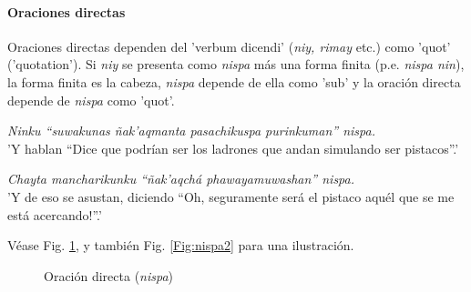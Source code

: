\documentclass[a4paper,11pt,DIV12]{scrartcl}
\begin{document}
\paragraph{Oraciones directas}
Oraciones directas dependen del 'verbum dicendi' ({\em niy, rimay} etc.) como 'quot' ('quotation'). Si {\em niy} se presenta como {\em nispa} m\'as una forma finita (p.e. {\em nispa nin}), la forma finita es la cabeza, {\em nispa} depende de ella como 'sub' y la oraci\'on directa depende de {\em nispa} como 'quot'.

\begin{examples}
 \item {\em Ninku ``suwakunas \~nak'aqmanta pasachikuspa purinkuman'' nispa.}\\
	'Y hablan ``Dice que podr\'ian ser los ladrones que andan simulando ser pistacos''.'
 \item {\em Chayta mancharikunku ``\~nak'aqch\'a phawayamuwashan'' nispa.}\\
      'Y de eso se asustan, diciendo ``{\textexclamdown}Oh, seguramente ser\'a el pistaco aqu\'el que se me est\'a acercando!''.'\\
  	\hfill{\small \citep[267]{Cusi2}}
  
\end{examples}

V\'ease Fig. \ref{Fig:nispa}, y tambi\'en Fig. \ref{Fig:nispa2} para una ilustraci\'on.

\begin{figure}

 \begin{center}
\end{center}
\caption{Oraci\'on directa ({\em nispa})}\label{Fig:nispa}
\end{figure}
\end{document}
